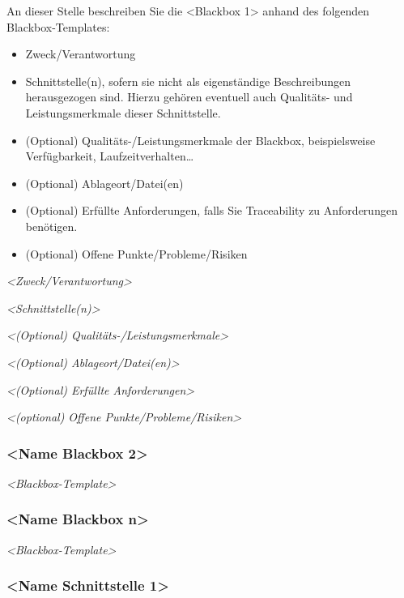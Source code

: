 \documentclass[]{article}
\begin{document}
An dieser Stelle beschreiben Sie die \textless{}Blackbox 1\textgreater{}
anhand des folgenden Blackbox-Templates:

\begin{itemize}
\item
  Zweck/Verantwortung
\item
  Schnittstelle(n), sofern sie nicht als eigenständige Beschreibungen
  herausgezogen sind. Hierzu gehören eventuell auch Qualitäts- und
  Leistungsmerkmale dieser Schnittstelle.
\item
  (Optional) Qualitäts-/Leistungsmerkmale der Blackbox, beispielsweise
  Verfügbarkeit, Laufzeitverhalten\ldots{}
\item
  (Optional) Ablageort/Datei(en)
\item
  (Optional) Erfüllte Anforderungen, falls Sie Traceability zu
  Anforderungen benötigen.
\item
  (Optional) Offene Punkte/Probleme/Risiken
\end{itemize}

\emph{\textless{}Zweck/Verantwortung\textgreater{}}

\emph{\textless{}Schnittstelle(n)\textgreater{}}

\emph{\textless{}(Optional) Qualitäts-/Leistungsmerkmale\textgreater{}}

\emph{\textless{}(Optional) Ablageort/Datei(en)\textgreater{}}

\emph{\textless{}(Optional) Erfüllte Anforderungen\textgreater{}}

\emph{\textless{}(optional) Offene
Punkte/Probleme/Risiken\textgreater{}}

\subsubsection{\textless{}Name Blackbox
2\textgreater{}}\label{__name_blackbox_2}

\emph{\textless{}Blackbox-Template\textgreater{}}

\subsubsection{\textless{}Name Blackbox
n\textgreater{}}\label{__name_blackbox_n}

\emph{\textless{}Blackbox-Template\textgreater{}}

\subsubsection{\textless{}Name Schnittstelle
1\textgreater{}}\label{__name_schnittstelle_1}
\end{document}
